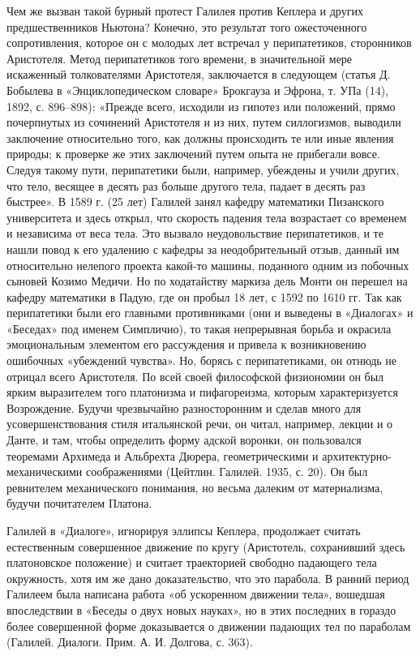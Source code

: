 Чем  же  вызван   такой  бурный  протест  Галилея   против  Кеплера  и
других   предшественников  Ньютона?   Конечно,   это  результат   того
ожесточенного  сопротивления,  которое  он   с  молодых  лет  встречал
у  перипатетиков,  сторонников  Аристотеля. Метод  перипатетиков  того
времени,  в  значительной  мере искаженный  толкователями  Аристотеля,
заключается  в  следующем  (статья Д.  Бобылева  в  «Энциклопедическом
словаре» Брокгауза и Эфрона, т.  УПа (14), 1892, с. 896--898): «Прежде
всего,  исходили  из  гипотез  или  положений,  прямо  почерпнутых  из
сочинений Аристотеля и из  них, путем силлогизмов, выводили заключение
относительно того, как должны происходить те или иные явления природы;
к проверке же  этих заключений путем опыта не  прибегали вовсе. Следуя
такому  пути, перипатетики  были, например,  убеждены и  учили других,
что  тело,  весящее  в  десять  раз  больше  другого  тела,  падает  в
десять  раз  быстрее».  В  1589  г. (25  лет)  Галилей  занял  кафедру
математики  Пизанского  университета  и  здесь  открыл,  что  скорость
падения  тела  возрастает  со  временем и  независима  от  веса  тела.
Это  вызвало неудовольствие  перипатетиков,  и те  нашли  повод к  его
удалению с  кафедры за  неодобрительный отзыв, данный  им относительно
нелепого проекта какой-то машины,  поданного одним из побочных сыновей
Козимо  Медичи. Но  по ходатайству  маркиза дель  Монти он  перешел на
кафедру  математики в  Падую, где  он пробыл  18 лет,  с 1592  по 1610
гг.  Так  как  перипатетики  были его  главными  противниками  (они  и
выведены  в «Диалогах»  и «Беседах»  под именем  Симпличио), то  такая
непрерывная борьба и окрасила  эмоциональным элементом его рассуждения
и привела к возникновению ошибочных  «убеждений чувства». Но, борясь с
перипатетиками, он отнюдь  не отрицал всего Аристотеля.  По всей своей
философской  физиономии он  был  ярким выразителем  того платонизма  и
пифагореизма, которым характеризуется  Возрождение. Будучи чрезвычайно
разносторонним и сделав много для усовершенствования стиля итальянской
речи, он  читал, например, лекции и  о Данте, и там,  чтобы определить
форму адской  воронки, он  пользовался теоремами Архимеда  и Альбрехта
Дюрера,  геометрическими  и  архитектурно-механическими  соображениями
(Цейтлин.  Галилей.  1935, с.  20).  Он  был ревнителем  механического
понимания,  но  весьма  далеким от  материализма,  будучи  почитателем
Платона.

Галилей  в «Диалоге»,  игнорируя эллипсы  Кеплера, продолжает  считать
естественным  совершенное движение  по кругу  (Аристотель, сохранивший
здесь платоновское положение) и считает траекторией свободно падающего
тела окружность, хотя  им же дано доказательство, что  это парабола. В
ранний период  Галилеем была  написана работа «об  ускоренном движении
тела», вошедшая впоследствии в «Беседы о двух новых науках», но в этих
последних в  гораздо более  совершенной форме доказывается  о движении
падающих тел по  параболам (Галилей. Диалоги. Прим. А.  И. Долгова, с.
363).

